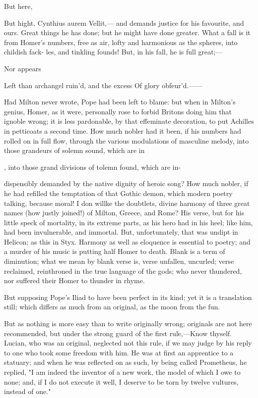 \documentclass{article}
\begin{document}
But here,

But hight,
Cynthius aurem
Vellit,—
and demands justice for his favourite, and ours. Great
things he has done; but he might have done greater.
What a fall is it from Homer's numbers, free as air,
lofty and harmonious as the spheres, into childish fack-
les, and tinkling founds! But, in his fall, he is full
great;—

Nor appears

Left than archangel ruin'd, and the excess
Of glory obfeur'd.——

Had Milton never wrote, Pope had been left to blame: but when in Milton's genius, Homer, as it were, personally rose to forbid Britons doing him that ignoble wrong; it is less pardonable, by that effeminate decoration, to put Achilles in petticoats a second time. How much nobler had it been, if his numbers had rolled on in full flow, through the various modulations of masculine melody, into those grandeurs of solemn sound, which are in

, into those grand divisions of tolemn found, which are in-

dispensibly demanded by the native dignity of heroic song? How much nobler, if he had refilled the temptation of that Gothic demon, which modern poetry talking, because moral! I don willke the doubtlets, divine harmony of three great names (how justly joined!) of Milton, Greece, and Rome? His verse, but for his little speck of mortality, in its extreme parts, as his hero had in his heel; like him, had been invulnerable, and immortal. But, unfortunately, that was undipt in Helicon; as this in Styx. Harmony as well as eloquence is essential to poetry; and a murder of his music is putting half Homer to death. Blank is a term of diminution; what we mean by blank verse is, verse unfallen, uncurled; verse reclaimed, reinthroned in the true language of the gods; who never thundered, nor suffered their Homer to thunder in rhyme.

But supposing Pope's Iliad to have been perfect in its kind; yet it is a translation still; which differs as much from an original, as the moon from the fun.

But as nothing is more easy than to write originally wrong; originals are not here recommended, but under the strong guard of the first rule,—Know thyself. Lucian, who was an original, neglected not this rule, if we may judge by his reply to one who took some freedom with him. He was at first an apprentice to a statuary; and when he was reflected on as such, by being called Prometheus, he replied, "I am indeed the inventor of a new work, the model of which I owe to none; and, if I do not execute it well, I deserve to be torn by twelve vultures, instead of one."
\end{document}
